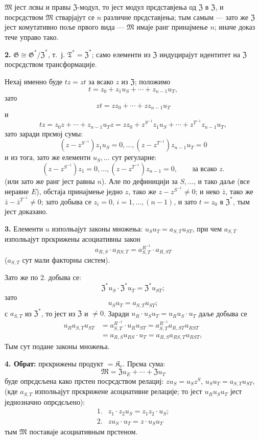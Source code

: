 \documentclass[11pt]{article}
\begin{document}
\(\mathfrak M\) јест лєвы и правы \(\mathfrak Z\)-модул, то јест модул прєдставјења од \(\mathfrak Z\) в \(\mathfrak Z\), и посрєдством \(\mathfrak M\) стварјајут се \(n\) различне прєдставјења; тым самым --- зато же \(\mathfrak Z\) јест комутативно поље првого вида --- \(\mathfrak M\) имаје ранг принајмење \(n\); иначе доказ тече управо тако.

\noindent\textbf{2.} \(\mathfrak G\cong\mathfrak G^*/\mathfrak Z^*\), т.~ј. \(\mathfrak T^*=\mathfrak Z^*\); само елементи из \(\mathfrak Z\) индуцирајут идентитет на \(\mathfrak Z\) посрєдством трансформације.

Нехај именно буде \(tz=zt\) за всако \(z\) из \(\mathfrak Z\); положимо
\[
t=z_0+z_1u_S+\cdots+z_{n-1}u_T,
\]
зато
\[
zt=zz_0+\cdots+zz_{n-1}u_T
\]
и
\[
tz=z_0z+\cdots+z_{n-1}u_Tz
=zz_0+z^{S^{-1}}z_1u_S+\cdots+z^{T^{-1}}z_{n-1}u_T,
\]
зато заради прємој сумы:
\[
(z-z^{S^{-1}})z_1u_S=0,\ldots,
(z-z^{T^{-1}})z_{n-1}u_T=0
\]
и из тога, зато же елементи \(u_S,\ldots\) сут регуларне:
\[
(z-z^{S^{-1}})z_1=0,\ldots,
(z-z^{T^{-1}})z_{n-1}=0,
\qquad\text{за всако }z.
\]
(или зато же ранг јест равны \(n\)). Але по дефиницији за \(S,\ldots\), и тако даље (все неравне \(E\)), обстаја принајмење једно \(z\), тако же \(z-z^{S^{-1}}\neq0\); и неко \(\bar z\), тако же \(\bar z-\bar z^{T^{-1}}\neq0\); зато добыва се \(z_i=0\), \(i=1,\ldots,(n-1)\), и зато \(t=z_0\) в \(\mathfrak Z^*\), тым јест доказано.

\noindent\textbf{3.} Елементи \(u\) изполњајут законы множења: \(u_Su_T=a_{S,T}u_{ST}\), при чем \(a_{S,T}\) изполњајут прєкрижены асоциативны закон
\[
a_{R,S}\cdot a_{RS,T}=a_{S,T}^{R^{-1}}\cdot a_{R,ST}
\]
(\(a_{S,T}\) сут мали факторны систем).

Зато же по 2. добыва се:
\[
\mathfrak Z^*u_S\cdot\mathfrak Z^*u_T=\mathfrak Z^*u_{ST};
\]
зато
\[
u_Su_T=a_{S,T}u_{ST};
\]
с \(a_{S,T}\) из \(\mathfrak Z^*\), то јест из \(\mathfrak Z\) и \(\neq0\). Заради \(u_R\cdot u_Su_T=u_Ru_S\cdot u_T\) даље добыва се
\[
\begin{aligned}
u_Ra_{S,T}u_{ST}
&=a_{S,T}^{R^{-1}}\cdot u_Ru_{ST}
 =a_{S,T}^{R^{-1}}a_{R,ST}u_{RST}\\
&=a_{R,S}u_{RS}\cdot u_T
 =a_{R,S}a_{RS,T}u_{RST},
\end{aligned}
\]
Тым сут подане законы множења.

\noindent\textbf{4. Обрат:} прєкрижены продукт \(=\mathfrak K_r\). Прєма сума:
\[
\mathfrak M=\mathfrak Zu_E+\cdots+\mathfrak Zu_T
\]
буде опрєдєљена како прстен посрєдством релациј: \(zu_S=u_Sz^S\), \(u_Su_T=a_{S,T}u_{ST}\), (кде \(a_{S,T}\) изполњајут прєкрижене асоциативне релације; то јест \(u_Ru_Su_T\) јест једнозначно опрєдєљено):
\[
\begin{array}{ll}
1.&z_1\cdot z_2u_S=z_1z_2\cdot u_S;\\[2pt]
2.&zu_S\cdot u_T=z\cdot u_Su_T
\end{array}
\]
тым \(\mathfrak M\) поставаје асоциативным прстеном.
\end{document}
